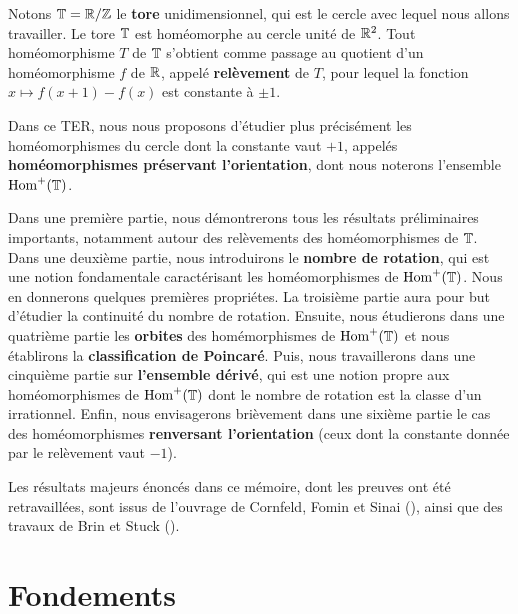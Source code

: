 


		\par Notons ${\mathbb{T}} ={\mathbb{R}}/{\mathbb{Z}}$ le \textbf{tore} unidimensionnel, qui est le cercle avec lequel nous allons travailler. Le tore ${\mathbb{T}}$ est homéomorphe au cercle unité de ${\mathbb{R}}^2$. Tout homéomorphisme $T$ de ${\mathbb{T}}$ s'obtient comme passage au quotient d'un homéomorphisme $f$ de ${\mathbb{R}}$, appelé \textbf{relèvement} de $T$, pour lequel la fonction $x\mapsto f(x+1)-f(x)$ est constante à $\pm1$.\\

		\par Dans ce TER, nous nous proposons d'étudier plus précisément les homéomorphismes du cercle dont la constante vaut $+1$, appelés \textbf{homéomorphismes préservant l'orientation}, dont nous noterons l'ensemble $\mathrm{Hom}^+({\mathbb{T}})$.\\

		\par Dans une première partie, nous démontrerons tous les résultats préliminaires importants, notamment autour des relèvements des homéomorphismes de ${\mathbb{T}}$. Dans une deuxième partie, nous introduirons le \textbf{nombre de rotation}, qui est une notion fondamentale caractérisant les homéomorphismes de $\mathrm{Hom}^+({\mathbb{T}})$. Nous en donnerons quelques premières propriétes. La troisième partie aura pour but d'étudier la continuité du nombre de rotation. Ensuite, nous étudierons dans une quatrième partie les \textbf{orbites} des homémorphismes de $\mathrm{Hom}^+({\mathbb{T}})$ et nous établirons la \textbf{classification de Poincaré}. Puis, nous travaillerons dans une cinquième partie sur \textbf{l'ensemble dérivé}, qui est une notion propre aux homéomorphismes de $\mathrm{Hom}^+({\mathbb{T}})$ dont le nombre de rotation est la classe d'un irrationnel. Enfin, nous envisagerons brièvement dans une sixième partie le cas des homéomorphismes \textbf{renversant l'orientation} (ceux dont la constante donnée par le relèvement vaut $-1$).\\

		\par Les résultats majeurs énoncés dans ce mémoire, dont les preuves ont été retravaillées, sont issus de l'ouvrage de Cornfeld, Fomin et Sinai (\cite{1}), ainsi que des travaux de Brin et Stuck (\cite{2}).





\section{Fondements}


